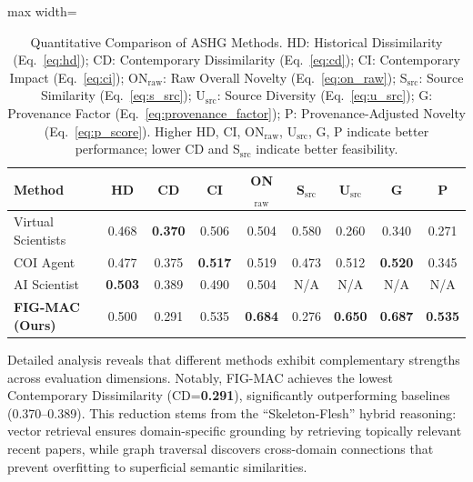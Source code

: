\documentclass[runningheads]{llncs}
\begin{document}
\begin{table}[t]
\centering
\small
\setlength{\tabcolsep}{2pt}
\begin{adjustbox}{max width=\textwidth}
\begin{tabular}{lcccccccc}
\toprule
\textbf{Method} & \textbf{HD} & \textbf{CD} & \textbf{CI} & \textbf{ON$_{\text{raw}}$} & \textbf{S$_{\text{src}}$} & \textbf{U$_{\text{src}}$} & \textbf{G} & \textbf{P} \\
\midrule
Virtual Scientists & 0.468 & \textbf{0.370} & 0.506 & 0.504 & 0.580 & 0.260 & 0.340 & 0.271 \\
COI Agent & 0.477 & 0.375 & \textbf{0.517} & 0.519 & 0.473 & 0.512 & \textbf{0.520} & 0.345 \\
AI Scientist & \textbf{0.503} & 0.389 & 0.490 & 0.504 & N/A & N/A & N/A & N/A \\
\midrule
\textbf{FIG-MAC (Ours)} & 0.500 & 0.291 & 0.535 & \textbf{0.684} & 0.276 & \textbf{0.650} & \textbf{0.687} & \textbf{0.535} \\
\bottomrule
\end{tabular}
\end{adjustbox}
\caption{Quantitative Comparison of ASHG Methods. HD: Historical Dissimilarity (Eq.~\ref{eq:hd}); CD: Contemporary Dissimilarity (Eq.~\ref{eq:cd}); CI: Contemporary Impact (Eq.~\ref{eq:ci}); ON$_{\text{raw}}$: Raw Overall Novelty (Eq.~\ref{eq:on_raw}); S$_{\text{src}}$: Source Similarity (Eq.~\ref{eq:s_src}); U$_{\text{src}}$: Source Diversity (Eq.~\ref{eq:u_src}); G: Provenance Factor (Eq.~\ref{eq:provenance_factor}); P: Provenance-Adjusted Novelty (Eq.~\ref{eq:p_score}). Higher HD, CI, ON$_{\text{raw}}$, U$_{\text{src}}$, G, P indicate better performance; lower CD and S$_{\text{src}}$ indicate better feasibility.}
\label{tab:main_results}
\end{table}

Detailed analysis reveals that different methods exhibit complementary strengths across evaluation dimensions. Notably, FIG-MAC achieves the lowest Contemporary Dissimilarity (CD=\textbf{0.291}), significantly outperforming baselines (0.370--0.389). This reduction stems from the ``Skeleton-Flesh'' hybrid reasoning: vector retrieval ensures domain-specific grounding by retrieving topically relevant recent papers, while graph traversal discovers cross-domain connections that prevent overfitting to superficial semantic similarities.
\end{document}
